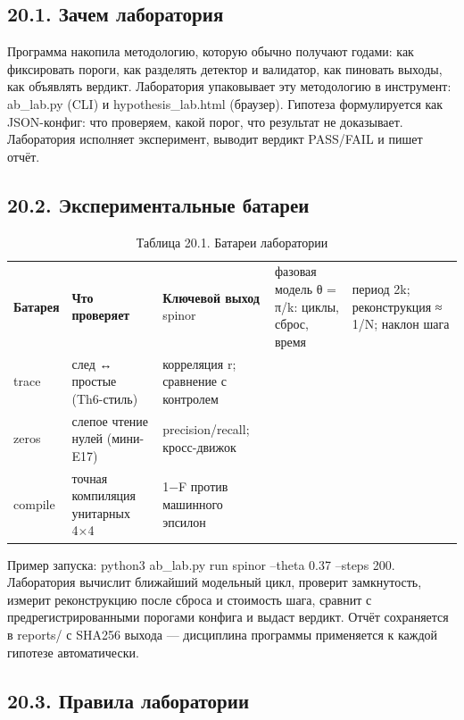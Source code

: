 \documentclass[11pt,a4paper]{article}
\begin{document}
\subsection{20.1. Зачем лаборатория}

Программа накопила методологию, которую обычно получают годами: как фиксировать пороги, как разделять детектор и валидатор, как пиновать выходы, как объявлять вердикт. Лаборатория упаковывает эту методологию в инструмент: ab\_lab.py (CLI) и hypothesis\_lab.html (браузер). Гипотеза формулируется как JSON-конфиг: что проверяем, какой порог, что результат не доказывает. Лаборатория исполняет эксперимент, выводит вердикт PASS/FAIL и пишет отчёт.

\subsection{20.2. Экспериментальные батареи}

\begin{table}[htbp]\centering\small
\caption{Таблица 20.1. Батареи лаборатории}
\begin{tabular}{p{} p{} p{}}
\toprule
\textbf{Батарея} & \textbf{Что проверяет} & \textbf{Ключевой выход}
\midrule
spinor & фазовая модель θ = π/k: циклы, сброс, время & период 2k; реконструкция ≈ 1/N; наклон шага \\
trace & след ↔ простые (Th6-стиль) & корреляция r; сравнение с контролем \\
zeros & слепое чтение нулей (мини-E17) & precision/recall; кросс-движок \\
compile & точная компиляция унитарных 4×4 & 1−F против машинного эпсилон \\
\bottomrule
\end{tabular}
\end{table}

Пример запуска: python3 ab\_lab.py run spinor --theta 0.37 --steps 200. Лаборатория вычислит ближайший модельный цикл, проверит замкнутость, измерит реконструкцию после сброса и стоимость шага, сравнит с предрегистрированными порогами конфига и выдаст вердикт. Отчёт сохраняется в reports/ с SHA256 выхода — дисциплина программы применяется к каждой гипотезе автоматически.

\subsection{20.3. Правила лаборатории}
\end{document}
